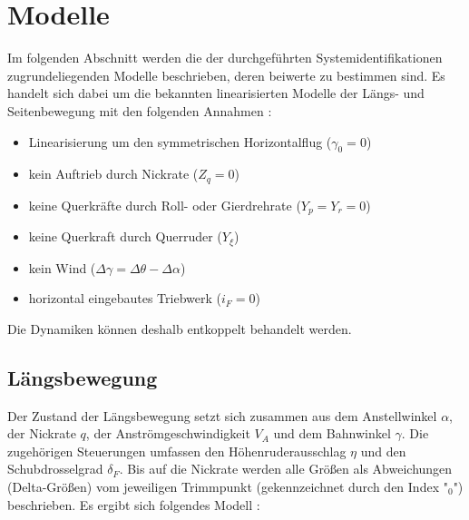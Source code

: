 \chapter{Modelle}

Im folgenden Abschnitt werden die der durchgeführten Systemidentifikationen zugrundeliegenden Modelle beschrieben, deren 
beiwerte zu bestimmen sind. Es handelt sich dabei um die bekannten linearisierten Modelle der Längs- und Seitenbewegung mit 
den folgenden Annahmen \cite{Fichter2009}:
\begin{itemize}
	\item Linearisierung um den symmetrischen Horizontalflug ($ \gamma_0=0 $)
	\item kein Auftrieb durch Nickrate ($ Z_q=0 $)
	\item keine Querkräfte durch Roll- oder Gierdrehrate ($ Y_p=Y_r=0 $)
	\item keine Querkraft durch Querruder ($ Y_\xi $)
	\item kein Wind ($ \Delta\gamma = \Delta\theta-\Delta\alpha $)
	\item horizontal eingebautes Triebwerk ($ i_F=0 $)
\end{itemize} 
Die Dynamiken können deshalb entkoppelt behandelt werden. %

\section{Längsbewegung}
Der Zustand der Längsbewegung setzt sich zusammen aus dem Anstellwinkel $ \alpha $, der Nickrate $ q $, der 
Anströmgeschwindigkeit $ V_A $ und dem Bahnwinkel $ \gamma $. Die zugehörigen Steuerungen umfassen den Höhenruderausschlag $ 
\eta $ und den Schubdrosselgrad $ \delta_F $. Bis auf die Nickrate werden alle Größen als Abweichungen (Delta-Größen) vom 
jeweiligen Trimmpunkt (gekennzeichnet durch den Index "$ _0 $") beschrieben. Es ergibt sich folgendes Modell 
\cite{Fichter2009}:

